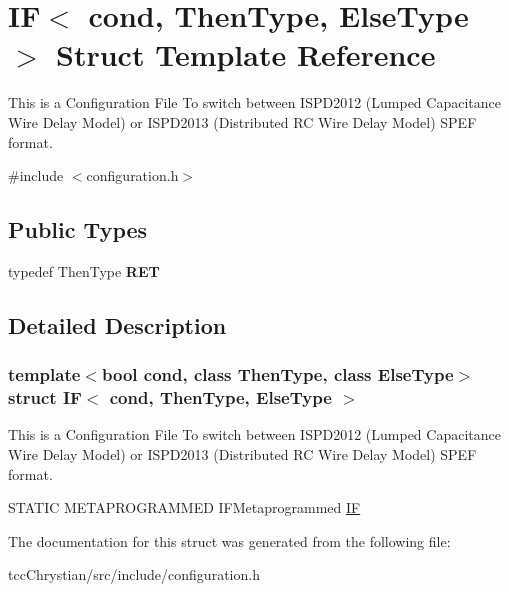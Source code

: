 \hypertarget{structIF}{\section{I\-F$<$ cond, Then\-Type, Else\-Type $>$ Struct Template Reference}
\label{structIF}
}


This is a Configuration File To switch between I\-S\-P\-D2012 (Lumped Capacitance Wire Delay Model) or I\-S\-P\-D2013 (Distributed R\-C Wire Delay Model) S\-P\-E\-F format.  




{\ttfamily \#include $<$configuration.\-h$>$}

\subsection*{Public Types}
\begin{DoxyCompactItemize}
\item 
\hypertarget{structIF_af93da5fd47eed555ff23c8d9022f8212}{typedef Then\-Type {\bfseries R\-E\-T}}\label{structIF_af93da5fd47eed555ff23c8d9022f8212}

\end{DoxyCompactItemize}


\subsection{Detailed Description}
\subsubsection*{template$<$bool cond, class Then\-Type, class Else\-Type$>$struct I\-F$<$ cond, Then\-Type, Else\-Type $>$}

This is a Configuration File To switch between I\-S\-P\-D2012 (Lumped Capacitance Wire Delay Model) or I\-S\-P\-D2013 (Distributed R\-C Wire Delay Model) S\-P\-E\-F format. 

S\-T\-A\-T\-I\-C M\-E\-T\-A\-P\-R\-O\-G\-R\-A\-M\-M\-E\-D I\-F\-Metaprogrammed \hyperlink{structIF}{I\-F} 

The documentation for this struct was generated from the following file\-:\begin{DoxyCompactItemize}
\item 
tcc\-Chrystian/src/include/configuration.\-h\end{DoxyCompactItemize}
